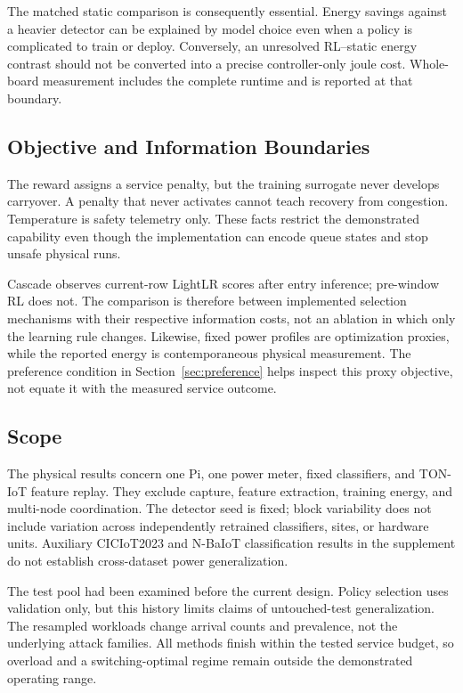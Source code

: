 \documentclass[journal]{IEEEtran}
\begin{document}
The matched static comparison is consequently essential. Energy savings against a heavier detector can be explained by model choice even when a policy is complicated to train or deploy. Conversely, an unresolved RL--static energy contrast should not be converted into a precise controller-only joule cost. Whole-board measurement includes the complete runtime and is reported at that boundary.

\subsection{Objective and Information Boundaries}
The reward assigns a service penalty, but the training surrogate never develops carryover. A penalty that never activates cannot teach recovery from congestion. Temperature is safety telemetry only. These facts restrict the demonstrated capability even though the implementation can encode queue states and stop unsafe physical runs.

Cascade observes current-row LightLR scores after entry inference; pre-window RL does not. The comparison is therefore between implemented selection mechanisms with their respective information costs, not an ablation in which only the learning rule changes. Likewise, fixed power profiles are optimization proxies, while the reported energy is contemporaneous physical measurement. The preference condition in Section~\ref{sec:preference} helps inspect this proxy objective, not equate it with the measured service outcome.

\subsection{Scope}
The physical results concern one Pi, one power meter, fixed classifiers, and TON-IoT feature replay. They exclude capture, feature extraction, training energy, and multi-node coordination. The detector seed is fixed; block variability does not include variation across independently retrained classifiers, sites, or hardware units. Auxiliary CICIoT2023 and N-BaIoT classification results in the supplement do not establish cross-dataset power generalization.

The test pool had been examined before the current design. Policy selection uses validation only, but this history limits claims of untouched-test generalization. The resampled workloads change arrival counts and prevalence, not the underlying attack families. All methods finish within the tested service budget, so overload and a switching-optimal regime remain outside the demonstrated operating range.
\end{document}
